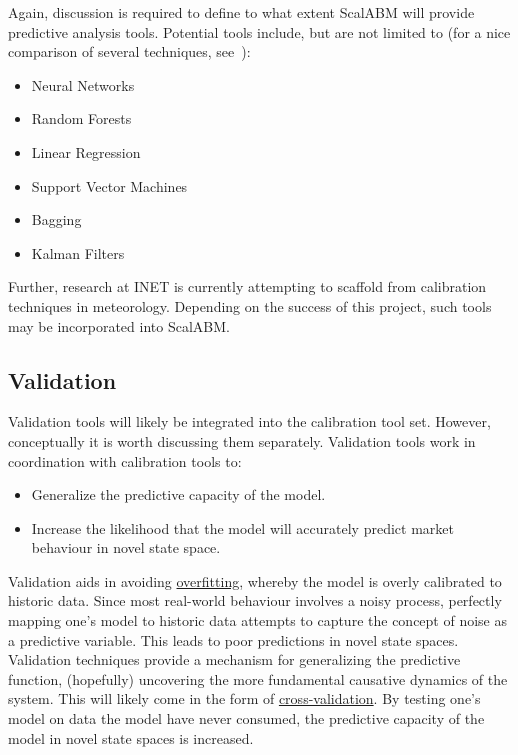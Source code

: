 \documentclass[a4paper]{article}
\begin{document}
Again, discussion is required to define to what extent ScalABM will provide predictive analysis tools. Potential tools include, but are not limited to (for a nice comparison of several techniques, see~\citealp{Bajari2015machinelearning}):

\begin{itemize}
    \item Neural Networks
    \item Random Forests
    \item Linear Regression 
    \item Support Vector Machines
    \item Bagging
    \item Kalman Filters~\citep{Ward150703}
\end{itemize}

Further, research at INET is currently attempting to scaffold from calibration techniques in meteorology. Depending on the success of this project, such tools may be incorporated into ScalABM.

\subsection{Validation}
\label{Validation}

Validation tools will likely be integrated into the calibration tool set. However, conceptually it is worth discussing them separately. Validation tools work in coordination with calibration tools to: 

\begin{itemize}
    \item Generalize the predictive capacity of the model.
    \item Increase the likelihood that the model will accurately predict market behaviour in novel state space.
\end{itemize}

Validation aids in avoiding \href{http://en.wikipedia.org/wiki/Overfitting}{overfitting}, whereby the model is overly calibrated to historic data. Since most real-world behaviour involves a noisy process, perfectly mapping one's model to historic data attempts to capture the concept of noise as a predictive variable. This leads to poor predictions in novel state spaces. Validation techniques provide a mechanism for generalizing the predictive function, (hopefully) uncovering the more fundamental causative dynamics of the system. This will likely come in the form of \href{http://en.wikipedia.org/wiki/Cross-validation_(statistics)}{cross-validation}. By testing one's model on data the model have never consumed, the predictive capacity of the model in novel state spaces is increased.
\end{document}
